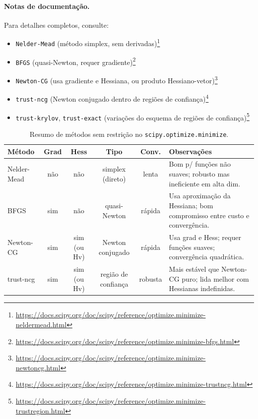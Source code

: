 \documentclass[9pt,a4paper]{extarticle}
\begin{document}
\paragraph{Notas de documenta\c c\~ao.}
Para detalhes completos, consulte:
\begin{itemize}
  \item \texttt{Nelder-Mead} (método simplex, sem derivadas)\footnote{\url{https://docs.scipy.org/doc/scipy/reference/optimize.minimize-neldermead.html}}
  \item \texttt{BFGS} (quasi-Newton, requer gradiente)\footnote{\url{https://docs.scipy.org/doc/scipy/reference/optimize.minimize-bfgs.html}}
  \item \texttt{Newton-CG} (usa gradiente e Hessiana, ou produto Hessiano-vetor)\footnote{\url{https://docs.scipy.org/doc/scipy/reference/optimize.minimize-newtoncg.html}}
  \item \texttt{trust-ncg} (Newton conjugado dentro de regi\~oes de confian\c ca)\footnote{\url{https://docs.scipy.org/doc/scipy/reference/optimize.minimize-trustncg.html}}
  \item \texttt{trust-krylov}, \texttt{trust-exact} (varia\c c\~oes do esquema de regi\~oes de confian\c ca)\footnote{\url{https://docs.scipy.org/doc/scipy/reference/optimize.minimize-trustregion.html}}
\end{itemize}

\begin{table}[h]
\centering
\small
\setlength{\tabcolsep}{5pt}
\renewcommand{\arraystretch}{1.15}
\begin{tabular}{@{}lccccp{7cm}@{}}
\toprule
\textbf{M\'etodo} & \textbf{Grad} & \textbf{Hess} & \textbf{Tipo} & \textbf{Conv.} & \textbf{Observa\c c\~oes} \\
\midrule
Nelder-Mead & n\~ao & n\~ao & simplex (direto) & lenta & Bom p/ fun\c c\~oes n\~ao suaves; robusto mas ineficiente em alta dim. \\
BFGS        & sim  & n\~ao & quasi-Newton & r\'apida & Usa aproxima\c c\~ao da Hessiana; bom compromisso entre custo e converg\^encia. \\
Newton-CG   & sim  & sim (ou Hv) & Newton conjugado & r\'apida & Usa grad e Hess; requer fun\c c\~oes suaves; converg\^encia quadr\'atica. \\
trust-ncg   & sim  & sim (ou Hv) & regi\~ao de confian\c ca & robusta & Mais est\'avel que Newton-CG puro; lida melhor com Hessianas indefinidas. \\
\bottomrule
\end{tabular}
\caption{Resumo de m\'etodos sem restri\c c\~ao no \texttt{scipy.optimize.minimize}.}
\end{table}
\end{document}
